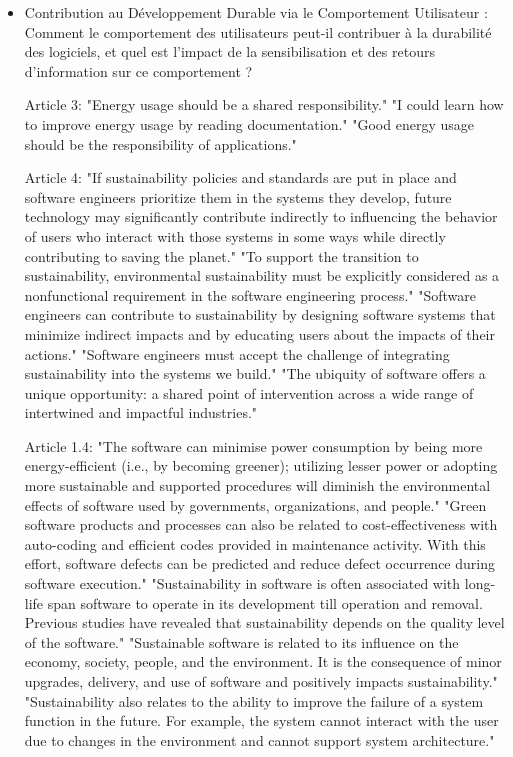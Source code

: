 \begin{itemize}
    \item Contribution au Développement Durable via le Comportement Utilisateur : \\
    Comment le comportement des utilisateurs peut-il contribuer à la durabilité des logiciels, et quel est l'impact de la sensibilisation et des retours d'information sur ce comportement ?

Article 3:
"Energy usage should be a shared responsibility."
"I could learn how to improve energy usage by reading documentation."
"Good energy usage should be the responsibility of applications."

Article 4:
"If sustainability policies and standards are put in place and software engineers prioritize them in the systems they develop, future technology may significantly contribute indirectly to influencing the behavior of users who interact with those systems in some ways while directly contributing to saving the planet."
"To support the transition to sustainability, environmental sustainability must be explicitly considered as a nonfunctional requirement in the software engineering process."
"Software engineers can contribute to sustainability by designing software systems that minimize indirect impacts and by educating users about the impacts of their actions."
"Software engineers must accept the challenge of integrating sustainability into the systems we build."
"The ubiquity of software offers a unique opportunity: a shared point of intervention across a wide range of intertwined and impactful industries."

Article 1.4:
"The software can minimise power consumption by being more energy-efficient (i.e., by becoming greener); utilizing lesser power or adopting more sustainable and supported procedures will diminish the environmental effects of software used by governments, organizations, and people." 
"Green software products and processes can also be related to cost-effectiveness with auto-coding and efficient codes provided in maintenance activity. With this effort, software defects can be predicted and reduce defect occurrence during software execution." 
"Sustainability in software is often associated with long-life span software to operate in its development till operation and removal. Previous studies have revealed that sustainability depends on the quality level of the software." 
"Sustainable software is related to its influence on the economy, society, people, and the environment. It is the consequence of minor upgrades, delivery, and use of software and positively impacts sustainability." 
"Sustainability also relates to the ability to improve the failure of a system function in the future. For example, the system cannot interact with the user due to changes in the environment and cannot support system architecture."


\end{itemize}

